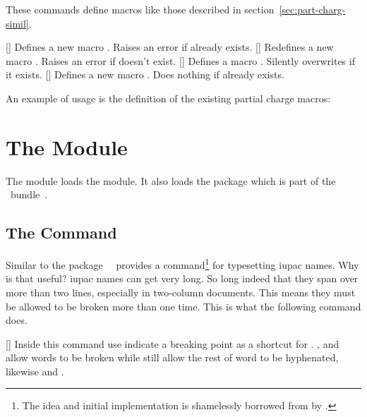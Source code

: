 \documentclass{chemmacros-manual}
\begin{document}
These commands define macros like those described in
section~\vref{sec:part-charg-simil}. 
\begin{commands}
  []
    Defines a new macro . Raises an error if  already
    exists.
  []
    Redefines a new macro . Raises an error if  doesn't
    exist.
  []
    Defines a macro .  Silently overwrites  if it exists.
  []
    Defines a new macro .  Does nothing if  already exists.
\end{commands}
An example of usage is the definition of the existing partial charge macros:
\begin{sourcecode}
  \NewChemPartialCharge\fdelp{\fplus}
  \NewChemPartialCharge\fdelm{\fminus}
\end{sourcecode}

\section{The  Module}\label{sec:nomenclature-module}

The  module loads the  module.  It
also loads the package  which is part of the
\KOMAScript\ bundle~\cite{bnd:koma-script}.

\subsection{The  Command}

Similar to the  package~\cite{pkg:bpchem} \chemmacros\ provides a
command\footnote{The idea and initial implementation is shamelessly borrowed
  from  by \pedersen.} for typesetting \ac{iupac} names.  Why is
that useful?  \ac{iupac} names can get very long.  So long indeed that they
span over more than two lines, especially in two-column documents.  This means
they must be allowed to be broken more than one time.  This is what the
following command does.
\begin{commands}
  []
    Inside this command use \sym{\textbar} indicate a breaking point
    \sym{\textasciicircum} as a shortcut for . \sym{-},
    \sym{(} and \sym{)} allow words to be broken while still allow the rest of
    word to be hyphenated, likewise \sym{[} and \sym{]}.
\end{commands}
\end{document}
